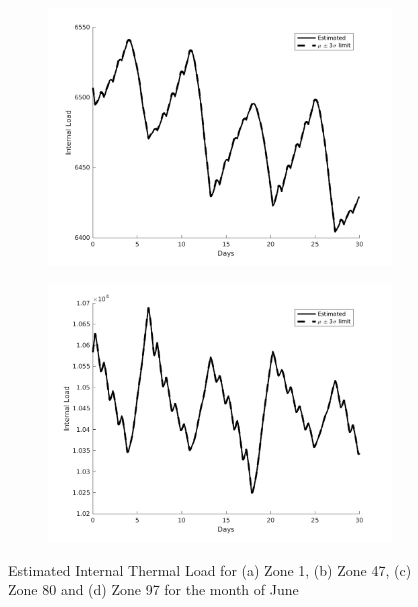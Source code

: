 \begin{figure}[H]
\begin{subfigure}{0.45\textwidth}
\includegraphics[width=\textwidth]{jbs_figures/load_3_6}
\caption{}
\label{load_3_6}
\end{subfigure}
\centering
\begin{subfigure}{0.45\textwidth}
\includegraphics[width=\textwidth]{jbs_figures/load_4_6}
\caption{}
\label{load_4_6}
\end{subfigure}
\caption{Estimated Internal Thermal Load for (a) Zone 1, (b) Zone 47, (c) Zone 80 and (d) Zone 97 for the month of June}
\label{fig:Zone_Int_temperature_june}
\end{figure}



